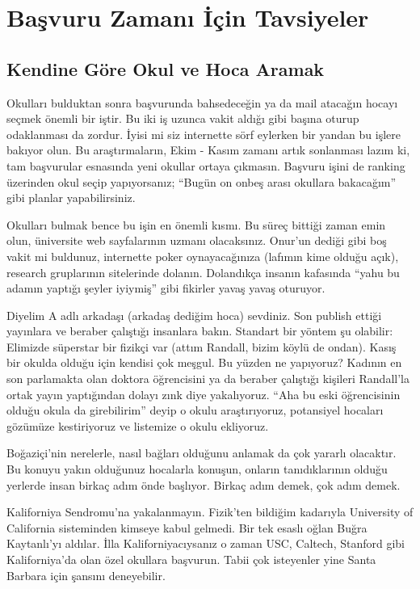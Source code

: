 \documentclass[12pt]{article}
\begin{document}
\newpage
%
%
\section{Başvuru Zamanı İçin Tavsiyeler}
%
\subsection{Kendine Göre Okul ve Hoca Aramak}
Okulları bulduktan sonra başvurunda bahsedeceğin ya da mail atacağın hocayı seçmek önemli bir iştir. Bu iki iş uzunca vakit aldığı gibi başına oturup odaklanması da zordur. İyisi mi siz internette sörf eylerken bir yandan bu işlere bakıyor olun. Bu araştırmaların, Ekim - Kasım zamanı artık sonlanması lazım ki, tam başvurular esnasında yeni okullar ortaya çıkmasın. Başvuru işini de ranking üzerinden okul seçip yapıyorsanız; “Bugün on onbeş arası okullara bakacağım” gibi planlar yapabilirsiniz.

Okulları bulmak bence bu işin en önemli kısmı. Bu süreç bittiği zaman emin olun, üniversite web sayfalarının uzmanı olacaksınız. Onur’un dediği gibi boş vakit mi buldunuz, internette poker oynayacağınıza (lafımın kime olduğu açık), research gruplarının sitelerinde dolanın. Dolandıkça insanın kafasında “yahu bu adamın yaptığı şeyler iyiymiş” gibi fikirler yavaş yavaş oturuyor.

Diyelim A adlı arkadaşı (arkadaş dediğim hoca) sevdiniz. Son publish ettiği yayınlara ve beraber çalıştığı insanlara bakın. Standart bir yöntem şu olabilir: Elimizde süperstar bir fizikçi var (attım Randall, bizim köylü de ondan). Kasış bir okulda olduğu için kendisi çok meşgul. Bu yüzden ne yapıyoruz? Kadının en son parlamakta olan doktora öğrencisini ya da beraber çalıştığı kişileri Randall’la ortak yayın yaptığından dolayı zınk diye yakalıyoruz. “Aha bu eski öğrencisinin olduğu okula da girebilirim” deyip o okulu araştırıyoruz, potansiyel hocaları gözümüze kestiriyoruz ve listemize o okulu ekliyoruz. 

Boğaziçi’nin nerelerle, nasıl bağları olduğunu anlamak da çok yararlı olacaktır. Bu konuyu yakın olduğunuz hocalarla konuşun, onların tanıdıklarının olduğu yerlerde insan birkaç adım önde başlıyor. Birkaç adım demek, çok adım demek. 

Kaliforniya Sendromu’na yakalanmayın. Fizik’ten bildiğim kadarıyla University of California sisteminden kimseye kabul gelmedi. Bir tek esaslı oğlan Buğra Kaytanlı’yı aldılar. İlla Kaliforniyacıysanız o zaman USC, Caltech, Stanford gibi Kaliforniya’da olan özel okullara başvurun. Tabii çok isteyenler yine Santa Barbara için şansını deneyebilir.
\end{document}
